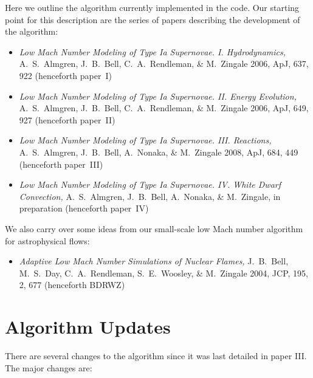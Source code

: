
Here we outline the algorithm currently implemented in the code.  Our
starting point for this description are the series of papers describing
the development of the algorithm:
\begin{itemize}
\item {\em Low Mach Number Modeling of Type Ia
  Supernovae. I. Hydrodynamics,} A.~S.~Almgren, J.~B.~Bell, 
  C.~A.~Rendleman, \& M.~Zingale 2006, ApJ, 637, 922 (henceforth
  paper~I)
\item {\em Low Mach Number Modeling of Type Ia Supernovae. II. Energy
  Evolution,} A.~S.~Almgren, J.~B.~Bell, C.~A.~Rendleman, \& M.~Zingale
  2006, ApJ, 649, 927 (henceforth paper~II)
\item {\em Low Mach Number Modeling of Type Ia Supernovae. III. Reactions,}
A.~S.~Almgren, J.~B.~Bell, A.~Nonaka, \& M.~Zingale
  2008, ApJ, 684, 449 (henceforth paper~III)
\item {\em Low Mach Number Modeling of Type Ia Supernovae. IV. White Dwarf Convection,}
A.~S.~Almgren, J.~B.~Bell, A.~Nonaka, \& M.~Zingale,
  in preparation (henceforth paper~IV)
\end{itemize}
We also carry over some ideas from our small-scale low Mach number algorithm
for astrophysical flows:
\begin{itemize}
\item {\em Adaptive Low Mach Number Simulations of Nuclear Flames,}
J.~B.~Bell, M.~S.~Day, C.~A.~Rendleman, S.~E.~Woosley, \& M.~Zingale
2004, JCP, 195, 2, 677 (henceforth BDRWZ)
\end{itemize}

\section{Algorithm Updates}

There are several changes to the algorithm since it was last detailed
in paper III.  The major changes are:

